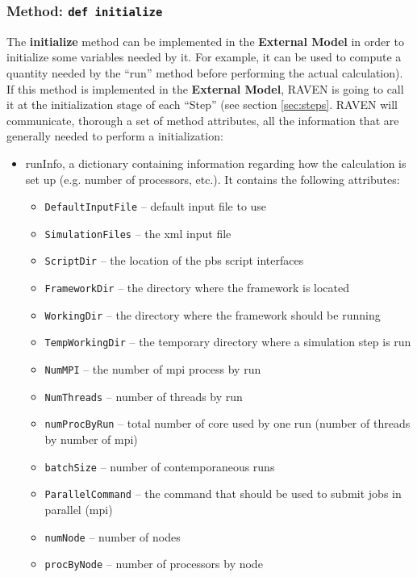 \subsubsection{Method: \texttt{def initialize}}
\label{subsubsec:externalInitialize}
The \textbf{initialize} method can be implemented in the \textbf{External Model}
in order to initialize some variables needed by it.
%
For example, it can be used to compute a quantity needed by the ``run'' method
before performing the actual calculation).
%
If this method is implemented in the \textbf{External Model}, RAVEN is going to
call it at the initialization stage of each ``Step'' (see section
\ref{sec:steps}.
%
RAVEN will communicate, thorough a set of method attributes, all the information
that are generally needed to perform a initialization:
\begin{itemize}
  \item runInfo, a dictionary containing information regarding how the
  calculation is set up (e.g. number of processors, etc.).
  It contains the following attributes:
  \begin{itemize}
    \item \texttt{DefaultInputFile} -- default input file to use
    \item \texttt{SimulationFiles} -- the xml input file
    \item \texttt{ScriptDir} -- the location of the pbs script interfaces
    \item \texttt{FrameworkDir} -- the directory where the framework is located
    \item \texttt{WorkingDir} -- the directory where the framework should be
    running
    \item \texttt{TempWorkingDir} -- the temporary directory where a simulation
    step is run
    \item \texttt{NumMPI} -- the number of mpi process by run
    \item \texttt{NumThreads} -- number of threads by run
    \item \texttt{numProcByRun} -- total number of core used by one run (number 
    of threads by number of mpi)
    \item \texttt{batchSize} -- number of contemporaneous runs
    \item \texttt{ParallelCommand} -- the command that should be used to submit
    jobs in parallel (mpi)
    \item \texttt{numNode} -- number of nodes
    \item \texttt{procByNode} -- number of processors by node

\end{itemize}
\end{itemize}
